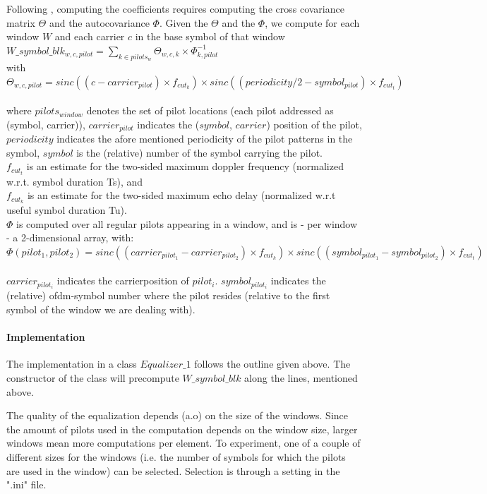 \documentclass[11pt]{article}
\begin{document}
Following \cite{Wiener}, computing the coefficients requires computing the
cross covariance matrix $\Theta$ and the autocovariance $\Phi$.
Given the $\Theta$ and the $\Phi$, we compute for each window $W$
and each carrier $c$ in the base symbol of that window
\ \\
{
$W\_symbol\_blk_{w, c, pilot} = \sum_{k \in pilots_{w}} \Theta_{w, c, k} \times \Phi_{k, pilot}^{-1}$
}
\ \\
with
\ \\
{
$\Theta_{w, c, pilot} = sinc ((c - carrier_{pilot}) \times f_{cut_k}) \times sinc ((periodicity / 2 - symbol_{pilot}) \times f_{cut_t})$
}
\ \\
where $pilots_{window}$ denotes the set of pilot locations
(each pilot addressed as (symbol, carrier)),
$carrier_{pilot}$ indicates the  ($symbol$, $carrier$) position of the pilot,
$periodicity$ indicates the afore mentioned
periodicity of the pilot patterns in the symbol, $symbol$ is the (relative)
number of the symbol carrying the pilot.
\ \\
$f_{cut_t}$
is an estimate
for the two-sided maximum doppler frequency (normalized w.r.t.
symbol duration Ts), and
\ \\
$f_{cut_k}$
is an estimate for the
two-sided maximum echo delay (normalized w.r.t useful symbol
duration Tu).
\ \\
$\Phi$ is computed over all regular pilots appearing in a window, and is
- per window - a 2-dimensional array, with:
\ \\
{
$\Phi (pilot_1, pilot_2) = sinc ((carrier_{pilot_1} - carrier_{pilot_2}) \times f_{cut_k}) \times
sinc ((symbol_{pilot_1} - symbol_{pilot_2}) \times f_{cut_t})$
}
\ \\
$carrier_{pilot_i}$ indicates the carrierposition of $pilot_i$.
$symbol_{pilot_i}$ indicates the (relative) ofdm-symbol number where the pilot
resides (relative to the first symbol of the window we are dealing with).

\paragraph{Implementation}
The implementation in a class $Equalizer\_1$ follows the outline given above. 
The constructor of the class will precompute 
$W\_symbol\_blk$ along the lines, mentioned above.

The quality of the equalization depends (a.o) on the size of the windows.
Since the amount of pilots used in the computation
depends on the window size, larger windows mean
more computations per element. 
To experiment, one of a couple of different sizes for
the windows (i.e. the number of symbols for which
the pilots are used in the window) can be selected.
Selection is through a setting in the ".ini" file.
\end{document}
